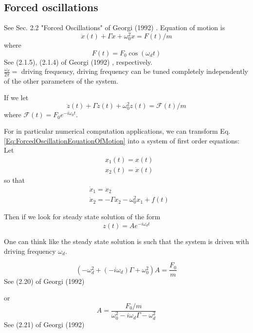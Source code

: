 \documentclass[10pt]{amsart}
\begin{document}
\begin{multicols*}{2}
\subsection{Forced oscillations} See Sec. 2.2 "Forced Oscillations" of Georgi (1992) \cite{Geor1992}.
Equation of motion is
\begin{equation}\label{Eq:ForcedOscillationEquationOfMotion}
	\ddot{x}(t) + \Gamma \dot{x} + \omega_0^2 x = F(t) /m 
\end{equation}
where
\begin{equation}
	F(t) = F_0 \cos{(\omega_dt)}
\end{equation}
See (2.1.5), (2.1.4) of Georgi (1992) \cite{Geor1992}, respectively. \\

$\frac{\omega_d}{2\pi} = $ driving frequency, driving frequency can be tuned completely independently of the other parameters of the system.

If we let 
\[
\ddot{z}(t) + \Gamma \dot{z}(t) + \omega_0^2 z(t) = \mathcal{F}(t) /m
\]
where $\mathcal{F}(t) = F_0 e^{-i \omega_0 t}$.

For in particular numerical computation applications, we can transform Eq. \ref{Eq:ForcedOscillationEquationOfMotion} into a system of first order equations: \\
Let 
\[
\begin{aligned}
	& x_1(t) = x(t) \\
	& x_2(t) = \dot{x}(t)
\end{aligned}
\]
so that
\[
\begin{aligned}
	& \dot{x}_1 = x_2 \\
	& \dot{x}_2 = -\Gamma x_2 - \omega_0^2 x_1 + f(t)
\end{aligned}
\]

Then if we look for steady state solution of the form
\[
z(t) = A e^{-i \omega_d t}
\]

One can think like the steady state solution is such that the system is driven with driving frequency $\omega_d$.

\begin{equation}
	(-\omega_d^2 + (-i \omega_d)\Gamma + \omega_0^2)A = \frac{F_0}{m} 
\end{equation}
See (2.20) of Georgi (1992) \cite{Geor1992}

or
\begin{equation}\label{Eq:ForcedOscillationSteadyStateSolutionAmplitude}
	A = \frac{ F_0 / m }{ \omega_0^2 - i\omega_d \Gamma - \omega_d^2}
\end{equation}
See (2.21) of Georgi (1992) \cite{Geor1992}


\end{multicols*}
\end{document}
